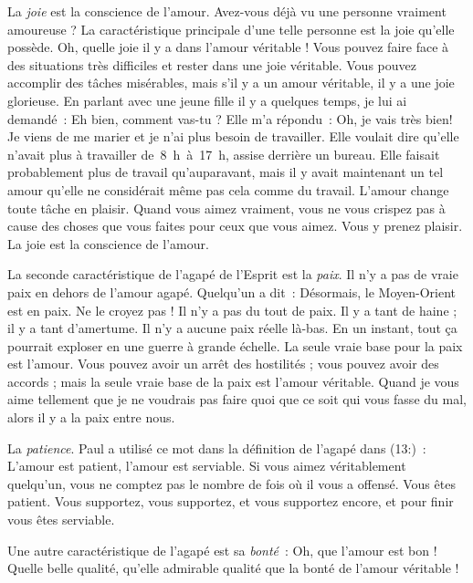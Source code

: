 La \emph{joie} est la conscience de l'amour.
 Avez-vous déjà vu une \linebreak
 personne vraiment amoureuse ?
 La caractéristique principale d'une telle personne est la joie
 qu'elle possède. Oh, quelle joie il y a dans l'amour véritable !
 Vous pouvez faire face à des situations très difficiles
 et rester dans une joie véritable. Vous pouvez accomplir
 des tâches misérables, mais s'il y a un amour véritable,
 il y a une joie glorieuse. En parlant avec une jeune fille
 il y a quelques temps, je lui ai demandé~:
 \og Eh bien, comment vas-tu ? \fg{} Elle m'a répondu~:
 \og Oh, je vais très bien! Je viens de me marier et je n'ai plus besoin
 de travailler. \fg{}
 Elle voulait dire qu'elle n'avait plus à travailler de~8~h~à~17~h,
 assise derrière un bureau. Elle faisait probablement plus de travail
 qu'auparavant, mais il y avait maintenant un tel amour
 qu'elle ne considérait même pas cela comme du travail.
 L'amour change toute tâche en plaisir. Quand vous aimez vraiment,
 vous ne vous crispez pas à cause des choses que vous faites
 pour ceux que vous aimez. Vous y prenez plaisir.
 La joie est la conscience de l'amour.

La seconde caractéristique de l'agapé de l'Esprit est la \emph{paix}.
 Il n'y a pas de vraie paix en dehors de l'amour agapé.
 Quelqu'un a dit~: \og Désormais, le Moyen-Orient est en paix. \fg{}
 Ne le croyez pas ! Il n'y a pas du tout de paix.
 Il y a tant de haine ; il y a tant d'amertume.
 Il n'y a aucune paix réelle là-bas. En un instant, tout ça pourrait
 exploser en une guerre à grande échelle.
 La seule vraie base pour la paix est l'amour.
 Vous pouvez avoir un arrêt des hostilités ; vous pouvez avoir des accords ;
 mais la seule vraie base de la paix est l'amour véritable.
 Quand je vous aime tellement que je ne voudrais pas faire
 quoi que ce soit qui vous fasse du mal, alors il y a la paix entre nous.

\begin{specialpar}{}
La \emph{patience}. Paul a utilisé ce mot dans la définition de l'agapé
 dans (13:)~:
 \og L'amour est patient, l'amour est serviable. \fg{}
 Si vous aimez véritablement quelqu'un, vous ne comptez pas
 le nombre de fois où il vous a offensé. Vous êtes patient.
 Vous supportez, vous supportez, et vous supportez encore,
 et pour finir vous êtes serviable.
\end{specialpar}

Une autre caractéristique de l'agapé est sa \emph{bonté}~:
 Oh, que l'amour est bon ! Quelle belle qualité,
 qu'elle admirable qualité que la bonté de l'amour véritable !

